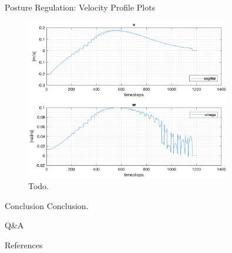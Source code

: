 \documentclass[10pt]{beamer}
\begin{document}
    \begin{frame}{Posture Regulation: Velocity Profile Plots}
        \begin{figure}
            \caption{Todo.}
            \includegraphics[width=0.8\textwidth]{images/unicycle_velocities.png}
        \end{figure}
    \end{frame}

    \begin{frame}{Conclusion}
        Conclusion.
    \end{frame}

    \begin{frame}[standout]
        Q\&A
    \end{frame}

    \appendix

    \begin{frame}{References}
        
        
    \end{frame}
\end{document}

